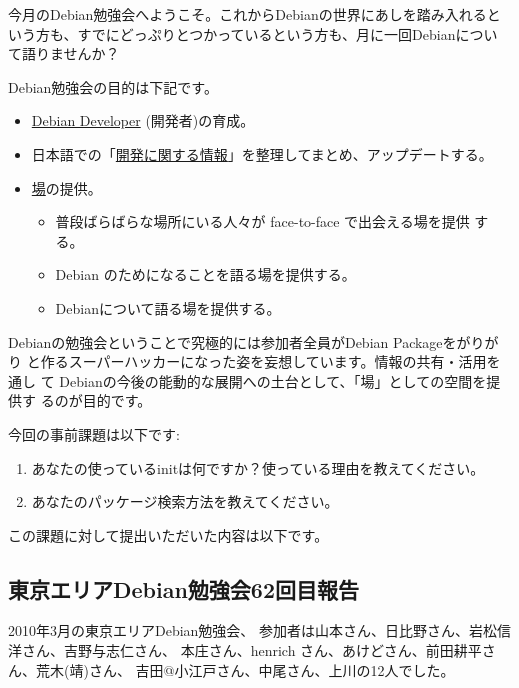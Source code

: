 \documentclass[mingoth,a4paper]{jsarticle}
\begin{document}
 
 今月のDebian勉強会へようこそ。これからDebianの世界にあしを踏み入れると
 いう方も、すでにどっぷりとつかっているという方も、月に一回Debianについ
 て語りませんか？

 Debian勉強会の目的は下記です。

 \begin{itemize}
 \item \underline{Debian Developer} (開発者)の育成。
 \item 日本語での「\underline{開発に関する情報}」を整理してまとめ、アップデートする。
 \item \underline{場}の提供。
 \begin{itemize}
  \item 普段ばらばらな場所にいる人々が face-to-face で出会える場を提供
	する。
  \item Debian のためになることを語る場を提供する。
  \item Debianについて語る場を提供する。
 \end{itemize}
 \end{itemize}		

 Debianの勉強会ということで究極的には参加者全員がDebian Packageをがりがり
 と作るスーパーハッカーになった姿を妄想しています。情報の共有・活用を通し
 て Debianの今後の能動的な展開への土台として、「場」としての空間を提供す
 るのが目的です。

\newpage
{}

今回の事前課題は以下です:

\begin{enumerate}
 \item あなたの使っているinitは何ですか？使っている理由を教えてください。
 \item あなたのパッケージ検索方法を教えてください。

\end{enumerate}

この課題に対して提出いただいた内容は以下です。



\subsection{東京エリアDebian勉強会62回目報告}

2010年3月の東京エリアDebian勉強会、
参加者は山本さん、日比野さん、岩松信洋さん、吉野与志仁さん、
本庄さん、henrich さん、あけどさん、前田耕平さん、荒木(靖)さん、
吉田@小江戸さん、中尾さん、上川の12人でした。
\end{document}
